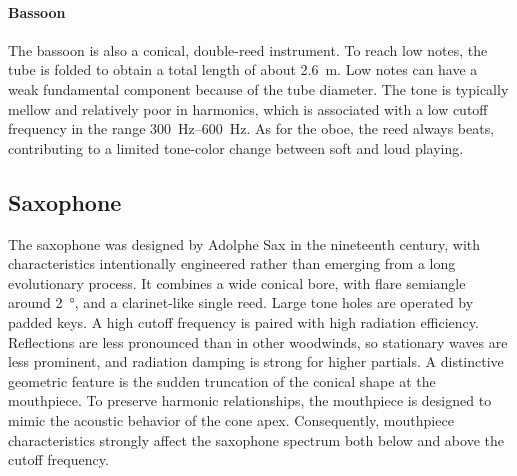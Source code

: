 \paragraph{Bassoon} The bassoon is also a conical, double-reed instrument. To reach low notes, the tube is folded to obtain a total length of about \SI{2.6}{\meter}. Low notes can have a weak fundamental component because of the tube diameter. The tone is typically mellow and relatively poor in harmonics, which is associated with a low cutoff frequency in the range \SIrange{300}{600}{\hertz}. As for the oboe, the reed always beats, contributing to a limited tone-color change between soft and loud playing. 

\subsection{Saxophone}

The saxophone was designed by Adolphe Sax in the nineteenth century, with characteristics intentionally engineered rather than emerging from a long evolutionary process. It combines a wide conical bore, with flare semiangle around \SI{2}{\degree}, and a clarinet-like single reed. Large tone holes are operated by padded keys. A high cutoff frequency is paired with high radiation efficiency. Reflections are less pronounced than in other woodwinds, so stationary waves are less prominent, and radiation damping is strong for higher partials. A distinctive geometric feature is the sudden truncation of the conical shape at the mouthpiece. To preserve harmonic relationships, the mouthpiece is designed to mimic the acoustic behavior of the cone apex. Consequently, mouthpiece characteristics strongly affect the saxophone spectrum both below and above the cutoff frequency. 
